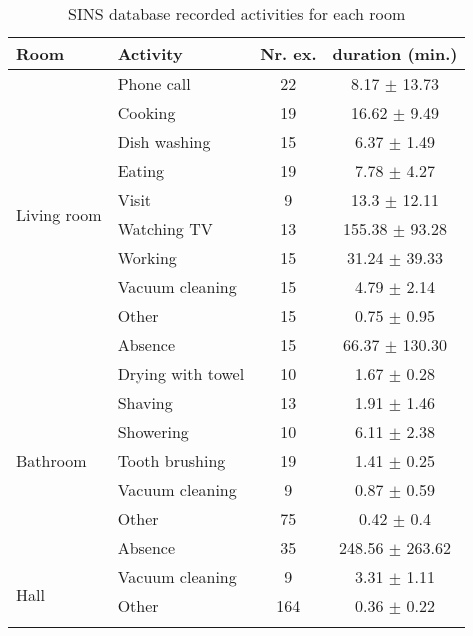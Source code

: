 \begin{table}[H]
    \centering
    \caption[SINS database recorded activities for each room]{SINS database recorded activities for each room \footnotemark}
	\label{tab:sins-database-recorded-activities}
    \begin{tabular}{l|l|c|c}
        \toprule
        \textbf{Room} & \textbf{Activity} & \textbf{Nr. ex.} & \textbf{duration (min.)} \\ 
        \midrule[1pt]
        \multirow{10}{*}{Living room} & Phone call & 22 & 8.17 $\pm$ 13.73 \\
        \cline{2-4}
        & Cooking & 19 & 16.62 $\pm$ 9.49 \\
        \cline{2-4}
        & Dish washing & 15 & 6.37 $\pm$ 1.49 \\
        \cline{2-4}
        & Eating & 19 & 7.78 $\pm$ 4.27 \\
        \cline{2-4}
        & Visit & 9 & 13.3 $\pm$ 12.11 \\
        \cline{2-4}
        & Watching TV & 13 & 155.38 $\pm$ 93.28 \\
        \cline{2-4}
        & Working & 15 & 31.24 $\pm$ 39.33 \\
        \cline{2-4}
        & Vacuum cleaning & 15 & 4.79 $\pm$ 2.14 \\
        \cline{2-4}
        & Other & 15 & 0.75 $\pm$ 0.95 \\
        \cline{2-4}
        & Absence & 15 & 66.37 $\pm$ 130.30 \\
        \midrule[1pt]
        \multirow{7}{*}{Bathroom} & Drying with towel & 10 & 1.67 $\pm$ 0.28 \\
        \cline{2-4}
        & Shaving & 13 & 1.91 $\pm$ 1.46 \\
        \cline{2-4}
        & Showering & 10 & 6.11 $\pm$ 2.38 \\
        \cline{2-4}
        & Tooth brushing & 19 & 1.41 $\pm$ 0.25 \\
        \cline{2-4}
        & Vacuum cleaning & 9 & 0.87 $\pm$ 0.59 \\
        \cline{2-4}
        & Other & 75 & 0.42 $\pm$ 0.4 \\
        \cline{2-4}
        & Absence & 35 & 248.56 $\pm$ 263.62 \\
        \midrule[1pt]
        \multirow{3}{*}{Hall} & Vacuum cleaning & 9 & 3.31 $\pm$ 1.11 \\
        \cline{2-4}
        & Other & 164 & 0.36 $\pm$ 0.22 \\
        \cline{2-4}

\end{tabular}
\end{table}
